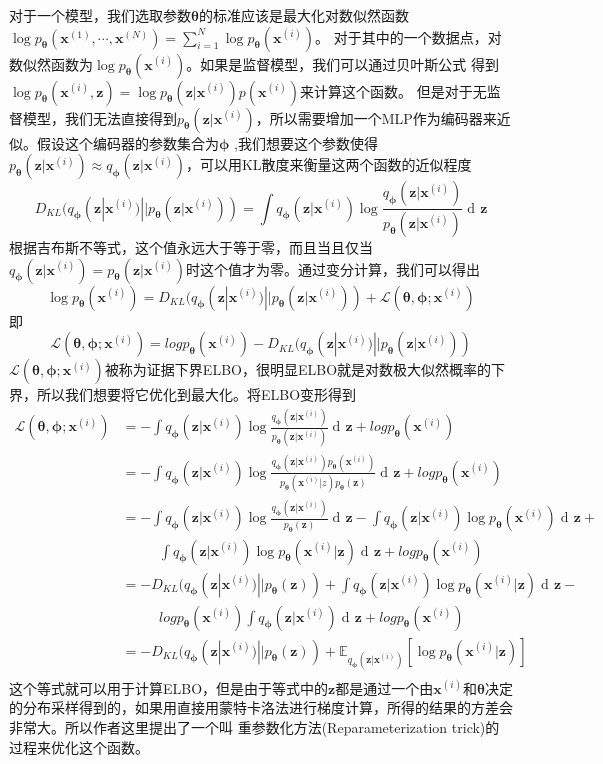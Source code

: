\documentclass[UTF8]{ctexart}
\DeclareMathOperator\dif{d\!}
\newcommand*{\bb}[1]{\mathbf{#1}}
\begin{document}
对于一个模型，我们选取参数$\bm\theta$的标准应该是最大化对数似然函数$\log p_{\bm\theta}(\bb x^{(1)},\cdots,\bb x^{(N)})=\sum^N_{i=1}\log p_{\bm\theta}(\bb x^{(i)})$。
对于其中的一个数据点，对数似然函数为$\log p_{\bm\theta}(\bb x^{(i)})$。如果是监督模型，我们可以通过贝叶斯公式
得到$\log p_{\bm\theta}(\bb x^{(i)},\bb z)=\log  p_{\bm\theta}(\bb z|\bb x^{(i)})p(\bb x^{(i)})$来计算这个函数。
但是对于无监督模型，我们无法直接得到$p_{\bm\theta}(\bb z|\bb x^{(i)})$，所以需要增加一个MLP作为编码器来近似。假设这个编码器的参数集合为$\bm\phi$
,我们想要这个参数使得$p_{\bm\theta}(\bb z| \bb x^{(i)})\approx q_{\bm\phi}(\bb z| \bb x^{(i)})$，可以用KL散度来衡量这两个函数的近似程度
\[
  D_{KL}(q_{\bm\phi}(\bb z| \bb x^{(i)})||p_{\bm\theta}(\bb z| \bb x^{(i)}))=\int q_{\bm\phi}(\bb z| \bb x^{(i)})\log \frac{q_{\bm\phi}(\bb z| \bb x^{(i)})}{p_{\bm\theta}(\bb z| \bb x^{(i)})} \dif \bb z
\]
根据吉布斯不等式，这个值永远大于等于零，而且当且仅当$q_{\bm\phi}(\bb z| \bb x^{(i)})=p_{\bm\theta}(\bb z| \bb x^{(i)})$时这个值才为零。通过变分计算，我们可以得出
\[
  \log p_{\bm\theta}(\bb x^{(i)}) = D_{KL}(q_{\bm\phi}(\bb z| \bb x^{(i)})||p_{\bm\theta}(\bb z| \bb x^{(i)})) + \mathcal{L}(\bm \theta,\bm \phi;\bb x^{(i)})
\]
即
\[
  \mathcal{L}(\bm \theta,\bm \phi;\bb x^{(i)}) =log p_{\bm\theta}(\bb x^{(i)})-D_{KL}(q_{\bm\phi}(\bb z| \bb x^{(i)})||p_{\bm\theta}(\bb z| \bb x^{(i)}))  
\]
$ \mathcal{L}(\bm \theta,\bm \phi;\bb x^{(i)})$被称为证据下界ELBO，很明显ELBO就是对数极大似然概率的下界，所以我们想要将它优化到最大化。将ELBO变形得到
\begin{align*}
  \mathcal{L}(\bm \theta,\bm \phi;\bb x^{(i)}) &= -\int q_{\bm\phi}(\bb z|\bb x^{(i)})\log \frac{q_{\bm\phi}(\bb z|\bb x^{(i)})}{p_{\bm\theta}(\bb z| \bb x^{(i)})} \dif \bb z +log p_{\bm\theta}(\bb x^{(i)})\\
  &= -\int q_{\bm\phi}(\bb z|\bb x^{(i)})\log \frac{q_{\bm\phi}(\bb z|\bb x^{(i)})p_{\bm\theta}(\bb x^{(i)})}{p_{\bm\theta}(\bb x^{(i)}|z)p_{\bm\theta}(\bb z)} \dif \bb z +log p_{\bm\theta}(\bb x^{(i)})\\
  &= -\int q_{\bm\phi}(\bb z| \bb x^{(i)})\log \frac{q_{\bm\phi}(\bb z| \bb x^{(i)})}{p_{\bm\theta}(\bb z)} \dif \bb z -\int q_{\bm\phi}(\bb z| \bb x^{(i)})\log p_{\bm\theta}(\bb x^{(i)})\dif \bb z+\\
  &\phantom{==}\int q_{\bm\phi}(\bb z| \bb x^{(i)})\log p_{\bm\theta}(\bb x^{(i)}|\bb z)\dif \bb z+log p_{\bm\theta}(\bb x^{(i)})\\
  &=-D_{KL}(q_{\bm\phi}(\bb z| \bb x^{(i)})||p_{\bm\theta}(\bb z))+\int q_{\bm\phi}(\bb z| \bb x^{(i)})\log p_{\bm\theta}(\bb x^{(i)}|\bb z)\dif \bb z -\\
  &\phantom{==}log p_{\bm\theta}(\bb x^{(i)})\int q_{\bm\phi}(\bb z| \bb x^{(i)})\dif \bb z+log p_{\bm\theta}(\bb x^{(i)})\\
  &=-D_{KL}(q_{\bm\phi}(\bb z| \bb x^{(i)})||p_{\bm\theta}(\bb z)) + \mathbb{E}_{q_{\bm\phi}(\bb z| \bb x^{(i)})}\left[ \log p_{\bm\theta}(\bb x^{(i)}|\bb z) \right]\\
\end{align*}
这个等式就可以用于计算ELBO，但是由于等式中的$\bb z$都是通过一个由$\bb x^{(i)}$和$\bm\theta$决定的分布采样得到的，如果用直接用蒙特卡洛法进行梯度计算，所得的结果的方差会非常大。所以作者这里提出了一个叫
重参数化方法(Reparameterization trick)的过程来优化这个函数。
\end{document}
